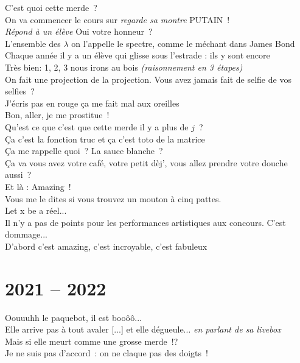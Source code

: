 \documentclass[french, a4paper, openany]{book}
\begin{document}
	\noindent \og C'est quoi cette merde~? \fg \\
	\og On va commencer le cours sur \emph{regarde sa montre} PUTAIN~! \fg \\
	\emph{Répond à un élève} \og Oui votre honneur~? \fg \\
	\og L'ensemble des $\lambda$ on l'appelle le spectre, comme le méchant dans James Bond \fg \\
	\og Chaque année il y a un élève qui glisse sous l'estrade : ils y sont encore \fg \\
	\og Très bien: 1, 2, 3 nous irons au bois \fg \emph{(raisonnement en 3 étapes)} \\
	\og On fait une projection de la projection. Vous avez jamais fait de selfie de vos selfies~? \fg \\
	\og J'écris pas en rouge ça me fait mal aux oreilles \fg \\
	\og Bon, aller, je me prostitue~! \fg \\
	\og Qu'est ce que c'est que cette merde il y a plus de $j$~? \fg \\
	\og Ça c'est la fonction truc et ça c'est toto de la matrice \fg \\
	\og Ça me rappelle quoi~? La sauce blanche~? \fg \\
	\og Ça va vous avez votre café, votre petit dèj', vous allez prendre votre douche aussi~? \fg \\
	\og Et là : Amazing~! \fg \\
	\og Vous me le dites si vous trouvez un mouton à cinq pattes. \fg \\
	\og Let x be a réel... \fg \\
	\og Il n'y a pas de points pour les performances artistiques aux concours. C'est dommage... \fg \\
	\og D'abord c'est amazing, c'est incroyable, c'est fabuleux \fg \\

\section{2021 -- 2022}

	\noindent \og Oouuuhh le paquebot, il est booôô... \fg \\
	\og Elle arrive pas à tout avaler [...] et elle dégueule... \fg \emph{en parlant de sa livebox} \\
	\og Mais si elle meurt comme une grosse merde~!? \fg \\
	\og Je ne suis pas d'accord~: on ne claque pas des doigts~! \fg \\
	
\end{document}
